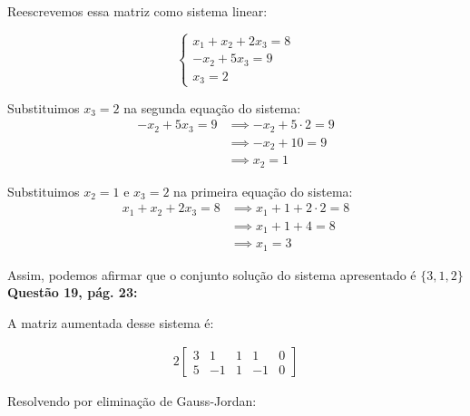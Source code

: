 \documentclass[a4paper,12pt]{article}
\begin{document}
Reescrevemos essa matriz como sistema linear:

\begin{equation}
    \begin{cases}
        x_1 +  x_2 +  2x_3 = 8 \\
        -x_2  + 5x_ 3 = 9 \\
        x_3 = 2
    \end{cases}
\end{equation}

Substituimos $x_3 = 2$ na segunda equação do sistema:
\begin{align*}
    -x_2  + 5x_ 3 = 9 &\implies -x_2  + 5\cdot 2 = 9\\
    &\implies -x_2  + 10 = 9\\
    &\implies x_ 2 = 1
\end{align*}

Substituimos $x_2 = 1$ e $x_3 = 2$ na primeira equação do sistema:
\begin{align*}
    x_1 +  x_2 +  2x_3 = 8 &\implies x_1 + 1 + 2\cdot2 = 8\\
    &\implies x_1 + 1 + 4 = 8\\
    &\implies x_1 = 3
\end{align*}

Assim, podemos afirmar que o conjunto solução do sistema apresentado é $\{3, 1, 2\}$ \\

\textbf{Questão 19, pág. 23:}

A matriz aumentada desse sistema é:

\begin{alignat*}{2}
    \begin{bmatrix}
        3 & 1 & 1 & 1 & 0\\
        5 & -1 & 1 & -1 & 0
    \end{bmatrix}
\end{alignat*}

Resolvendo por eliminação de Gauss-Jordan:
\end{document}
